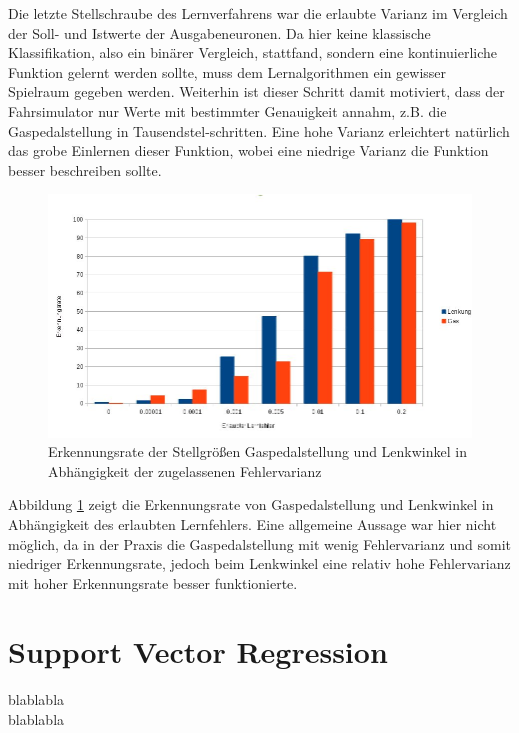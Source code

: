Die letzte Stellschraube des Lernverfahrens war die erlaubte Varianz im Vergleich der Soll- und Istwerte der Ausgabeneuronen. Da hier keine klassische Klassifikation, also ein binärer Vergleich, stattfand, sondern eine kontinuierliche Funktion gelernt werden sollte, muss dem Lernalgorithmen ein gewisser Spielraum gegeben werden. Weiterhin ist dieser Schritt damit motiviert, dass der Fahrsimulator nur Werte mit bestimmter Genauigkeit annahm, z.B. die Gaspedalstellung in Tausendstel-schritten. Eine hohe Varianz erleichtert natürlich das grobe Einlernen dieser Funktion, wobei eine niedrige Varianz die Funktion besser beschreiben sollte.\\

\begin{figure}[!h]
	\centering
	\includegraphics[scale=0.55]{images/nn/a3.jpg} 
	\caption{Erkennungsrate der Stellgrößen Gaspedalstellung und Lenkwinkel in Abhängigkeit der zugelassenen Fehlervarianz}
	\label{nnchrisa3}
\end{figure}

Abbildung \ref{nnchrisa3} zeigt die Erkennungsrate von Gaspedalstellung und Lenkwinkel in Abhängigkeit des erlaubten Lernfehlers. Eine allgemeine Aussage war hier nicht möglich, da in der Praxis die Gaspedalstellung mit wenig Fehlervarianz und somit niedriger Erkennungsrate, jedoch beim Lenkwinkel eine relativ hohe Fehlervarianz mit hoher Erkennungsrate besser funktionierte. 

\section{Support Vector Regression} %
\label{sec:SVR}
blablabla\\

blablabla


